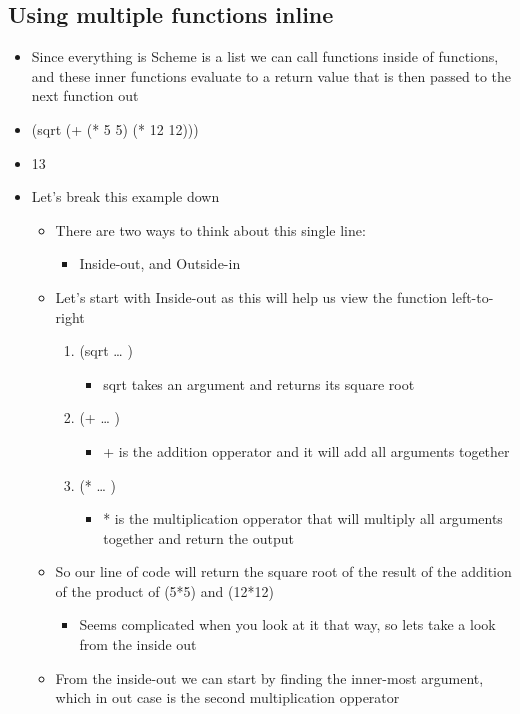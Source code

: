 \documentclass[11pt]{article}
\begin{document}
\subsection{Using multiple functions inline}
\label{sec:org19ae01d}
\begin{itemize}
\item Since everything is Scheme is a list we can call functions inside of functions, and these inner functions evaluate to a return value that is then passed to the next function out
\item (sqrt (+ (* 5 5) (* 12 12)))
\item 13
\item Let's break this example down
\begin{itemize}
\item There are two ways to think about this single line:
\begin{itemize}
\item Inside-out, and Outside-in
\end{itemize}
\item Let's start with Inside-out as this will help us view the function left-to-right
\begin{enumerate}
\item (sqrt \ldots{} )
\begin{itemize}
\item sqrt takes an argument and returns its square root
\end{itemize}
\item (+ \ldots{} )
\begin{itemize}
\item + is the addition opperator and it will add all arguments together
\end{itemize}
\item (* \ldots{} )
\begin{itemize}
\item * is the multiplication opperator that will multiply all arguments together and return the output
\end{itemize}
\end{enumerate}
\item So our line of code will return the square root of the result of the addition of the product of (5*5) and (12*12)
\begin{itemize}
\item Seems complicated when you look at it that way, so lets take a look from the inside out
\end{itemize}
\item From the inside-out we can start by finding the inner-most argument, which in out case is the second multiplication opperator

\end{itemize}
\end{itemize}
\end{document}
